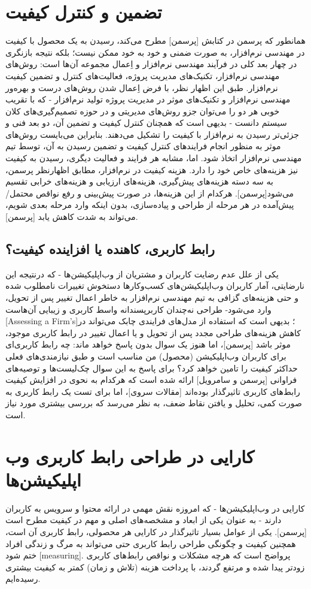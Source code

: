 \documentclass{report}
\theoremstyle{definition}
\begin{document}
	\section{تضمین و کنترل کیفیت}
همانطور که پرسمن در کتابش [پرسمن] مطرح می‌کند، رسیدن به یک محصول با کیفیت در مهندسی نرم‌افزار، به صورت ضمنی و خود به خود ممکن نیست؛ بلکه نتیجه بازنگری در چهار بعد کلی در فرآیند مهندسی نرم‌افزار و اِعمال مجموعه آن‌ها است: روش‌های مهندسی نرم‌افزار، تکنیک‌های مدیریت پروژه، فعالیت‌های کنترل و تضمین کیفیت نرم‌افزار. طبق این اظهار نظر، با فرض اِعمال شدن روش‌های درست و بهره‌ور مهندسی نرم‌افزار و تکنیک‌های موثر در مدیریت پروژه تولید نرم‌افزار - که با تقریب خوبی هر دو را می‌توان جزو روش‌های مدیریتی و در حوزه تصمیم‌گیری‌های کلان سیستم دانست - بدیهی است که همچنان کنترل کیفیت و تضمین آن، دو بعد فنی و جزئی‌تر رسیدن به نرم‌افزار با کیفیت را تشکیل می‌دهند. بنابراین می‌بایست روش‌های موثر به منظور انجام فرایند‌های کنترل کیفیت و تضمین رسیدن به آن، توسط تیم مهندسی نرم‌افزار اتخاذ شود.
اما، مشابه هر فرایند و فعالیت دیگری، رسیدن به کیفیت نیز هزینه‌های خاص خود را دارد. هزینه کیفیت در نرم‌افزار، مطابق اظهارنظر پرسمن، به سه دسته هزینه‌های پیش‌گیری، هزینه‌های ارزیابی و هزینه‌های خرابی تقسیم می‌شود[پرسمن]. هرکدام از این هزینه‌ها، در صورت پیش‌بینی و رفع نواقص محتمل/پیش‌آمده در هر مرحله از طراحی و پیاده‌سازی، بدون اینکه وارد مرحله بعدی شویم، می‌تواند به شدت کاهش یابد [پرسمن].
\subsection{رابط کاربری، کاهنده یا افزاینده کیفیت؟}
یکی از علل عدم رضایت کاربران و مشتریان از وب‌اپلیکیشن‌ها - که درنتیجه این نارضایتی، آمار کاربران وب‌اپلیکیشن‌های کسب‌وکارها دستخوش تغییرات نامطلوب شده و حتی هزینه‌های گزافی به تیم مهندسی نرم‌افزار به خاطر اعمال تغییر پس از تحویل، وارد می‌شود- طراحی نه‌چندان کاربرپسندانه واسط کاربری و زیبایی آن‌هاست [Assessing a Firm's]؛ بدیهی است که استفاده از مدل‌های فرایندی چابک می‌تواند در کاهش هزینه‌های طراحی مجدد پس از تحویل و یا اعمال تغییر در رابط کاربری موجود، موثر باشد [پرسمن]، اما هنوز یک سوال بدون پاسخ خواهد ماند: چه رابط کاربری‌ای برای کاربران وب‌اپلیکیشن (محصول) من مناسب است و طبق نیازمندی‌های فعلی حداکثر کیفیت را تامین خواهد کرد؟ برای پاسخ به این سوال چک‌لیست‌ها و توصیه‌های فراوانی [پرسمن و سامرویل] ارائه شده است که هرکدام به نحوی در افزایش کیفیت رابط‌های کاربری تاثیرگذار بوده‌اند [مقالات سروی]، اما برای تست یک رابط کاربری به صورت کمی، تحلیل و یافتن نقاط ضعف، به نظر می‌رسد که بررسی بیشتری مورد نیاز است.
\section{کارایی در طراحی رابط کاربری وب اپلیکیشن‌ها}
کارایی در وب‌اپلیکیشن‌ها - که امروزه نقش مهمی در ارائه محتوا و سرویس به کاربران دارند - به عنوان یکی از ابعاد و مشخصه‌های اصلی و مهم در کیفیت مطرح است [پرسمن]. یکی از عوامل بسیار تاثیرگذار در کارایی هر محصولی، رابط کاربری آن است، همچنین کیفیت و چگونگی طراحی رابط کاربری حتی می‌تواند به مرگ و زندگی افراد ختم شود [measuring]. پرواضح است که هرچه مشکلات و نواقص رابط‌های کاربری زودتر پیدا شده و مرتفع گردند، با پرداخت هزینه (تلاش و زمان) کمتر به کیفیت بیشتری رسیده‌ایم.
\end{document}
